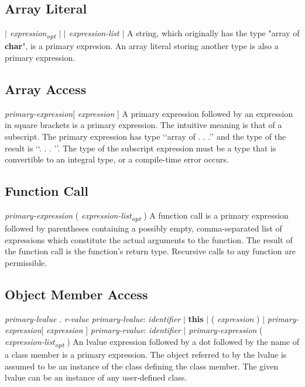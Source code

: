 \begin{homeworkProblem}
    \subsection{Array Literal}
    \textit{$|$ expression\textsubscript{opt} $|$ }
    \newline
    \textit{$|$ expression-list $|$ }
    \newline
    A string, which originally has the type "array of \textbf{char}", is a primary expresion. An array literal storing another type is also a primary expression.

    \subsection{Array Access}

    \textit{primary-expression}[ \textit{expression} ]
    \newline
    A primary expression followed by an expression in square brackets is a primary expression. The intuitive meaning is that of a subscript. The primary expression has type ‘‘array of . . .’’ and the type of the result is ‘‘. . . ’’. The type of the subscript expression must be a type that is convertible to an integral type, or a compile-time error occurs.

    \subsection{Function Call}
    \textit{primary-expression} ( \textit{expression-list\textsubscript{opt}} )
    \newline
    A function call is a primary expression followed by parentheses containing a possibly empty, comma-separated
    list of expressions which constitute the actual arguments to the function. The result of the function call is the function's return type. Recursive calls to any function are permissible.

    \subsection{Object Member Access}
    \textit{primary-lvalue} . \textit{r-value}
    \newline
    \textit{primary-lvalue}: \textit{identifier} $|$ \textbf{this} $|$ ( \textit{expression} ) $|$ \textit{primary-expression}[ \textit{expression} ]
    \newline
    \textit{primary-rvalue}: \textit{identifier} $|$ \textit{primary-expression} ( \textit{expression-list\textsubscript{opt}} )
    \newline
	An lvalue expression followed by a dot followed by the name of a class member is a primary expression. The object referred to by the lvalue is assumed to be an instance of the class defining the class member. The given lvalue can be an instance of any user-defined class.


\end{homeworkProblem}
